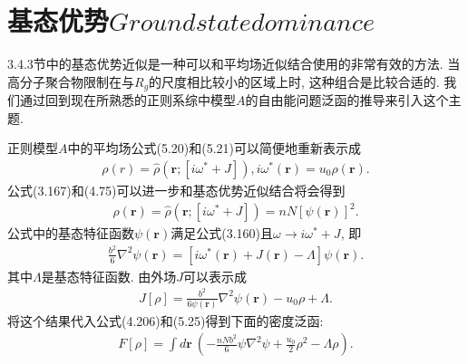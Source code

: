     \section{基态优势$Ground state dominance$}
    3.4.3节中的基态优势近似是一种可以和平均场近似结合使用的非常有效的方法.
    当高分子聚合物限制在与$R_{g}$的尺度相比较小的区域上时,
    这种组合是比较合适的.
    我们通过回到现在所熟悉的正则系综中模型$A$的自由能问题泛函的推导来引入这个主题.
    \par
    正则模型$A$中的平均场公式(5.20)和(5.21)可以简便地重新表示成
    \label{subsec.equations}
    \begin{equation}
        \begin{aligned}
        \rho(r)=\hat{\rho}(\bm{r};[i\omega^{*}+J]),
            i\omega^{*}(\bm{r})=u_{0}\rho(\bm{r}). 
                   \end{aligned}
        \label{eq5.51}
    \end{equation}
    公式(3.167)和(4.75)可以进一步和基态优势近似结合将会得到
    \label{subsec.equations}
    \begin{equation}
        \begin{aligned}
            \rho(\bm{r})=\hat{\rho}(\bm{r};[i\omega^{*}+J])=nN[\psi(\bm{r})]^{2}.
                   \end{aligned}
        \label{eq5.52}
    \end{equation}
    公式中的基态特征函数$\psi(\bm{r})$满足公式(3.160)且$\omega\longrightarrow
    i\omega^{*}+J$, 即
    \label{subsec.equations}
    \begin{equation}
        \begin{aligned}
            \frac{b^2}{6}\nabla^{2}\psi(\bm{r})=[i\omega^{*}(\bm{r})+J(\bm{r})-\Lambda]\psi(\bm{r}).
                   \end{aligned}
        \label{eq5.53}
    \end{equation}
其中$\Lambda$是基态特征函数. 由外场$J$可以表示成
    \label{subsec.equations}
    \begin{equation}
        \begin{aligned}
            J[\rho]=\frac{b^{2}}{6\psi(\bm{r})}\nabla^{2}\psi(\bm{r})-u_{0}\rho+\Lambda.
                   \end{aligned}
        \label{eq5.54}
    \end{equation}
将这个结果代入公式(4.206)和(5.25)得到下面的密度泛函:
    \label{subsec.equations}
    \begin{equation}
        \begin{aligned}
            F[\rho]=\int d\bm{r}\
            \left(-\frac{nNb^{2}}{6}\psi\nabla^{2}\psi+\frac{u_{0}}{2}\rho^{2}-\Lambda\rho
            \right).
                   \end{aligned}
        \label{eq5.55}
    \end{equation}
